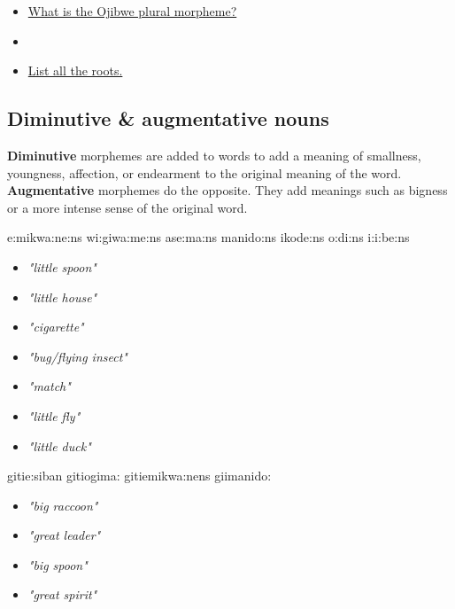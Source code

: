 \documentclass[a4paper,11pt]{article}
\begin{document}
\vspace{1cm}

\begin{itemize}
\item \underline{What is the Ojibwe plural morpheme?}
\item[] 
\item \underline{List all the roots.}
\end{itemize}

\pagebreak



\subsection{Diminutive \& augmentative nouns}

\textbf{Diminutive} morphemes are added to words to add a meaning of smallness, youngness, affection, or endearment to the original meaning of the word. \textbf{Augmentative} morphemes do the opposite. They add meanings such as bigness or a more intense sense of the original word. 

\vspace{1cm}

\begin{multicols}{2}
\begin{exe}
\ex e:mikwa:ne:ns 
\ex wi:giwa:me:ns 
\ex ase:ma:ns 
\ex manido:ns 
\ex ikode:ns
\ex o:d{\textyogh}i:ns 
\ex {\textyogh}i:i:be:ns 
\end{exe}
\columnbreak
\begin{itemize}
\item[] \textit{"little spoon"}
\item[] \textit{"little house"}
\item[] \textit{"cigarette"}
\item[] \textit{"bug/flying insect"}
\item[] \textit{"match"}
\item[] \textit{"little fly"}
\item[] \textit{"little duck"}
\end{itemize}
\end{multicols}

\begin{multicols}{2}
\begin{exe}
\ex gitie:siban 
\ex git{\textyogh}iogima: 
\ex git{}iemikwa:nens 
\ex giimanido: 
\end{exe}
\columnbreak
\begin{itemize}
\item[] \textit{"big raccoon"}
\item[] \textit{"great leader"}
\item[] \textit{"big spoon"}
\item[] \textit{"great spirit"}
\end{itemize}
\end{multicols}
\end{document}
